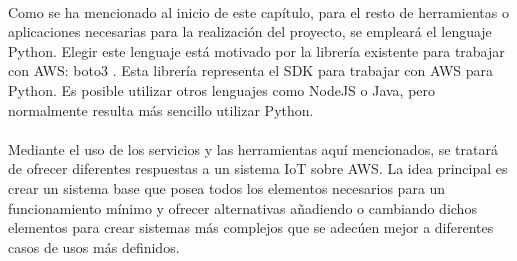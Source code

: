 \documentclass[../../memoria.tex]{subfiles}
\begin{document}
\paragraph{}
Como se ha mencionado al inicio de este capítulo, para el resto de herramientas o aplicaciones necesarias para la realización del proyecto, se empleará el lenguaje Python. Elegir este lenguaje está motivado por la librería existente para trabajar con AWS: boto3 \cite{boto3}. Esta librería representa el SDK para trabajar con AWS para Python. Es posible utilizar otros lenguajes como NodeJS o Java, pero normalmente resulta más sencillo utilizar Python.

\paragraph{}
Mediante el uso de los servicios y las herramientas aquí mencionados, se tratará de ofrecer diferentes respuestas a un sistema IoT sobre AWS. La idea principal es crear un sistema base que posea todos los elementos necesarios para un funcionamiento mínimo y ofrecer alternativas añadiendo o cambiando dichos elementos para crear sistemas más complejos que se adecúen mejor a diferentes casos de usos más definidos.
\end{document}
